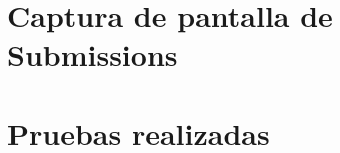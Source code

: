 \documentclass[a4paper, 20pt]{article}
\begin{document}
\section{Captura de pantalla de Submissions}
\label{sec:subsimissions}
\pagebreak


\section{Pruebas realizadas}
\end{document}

